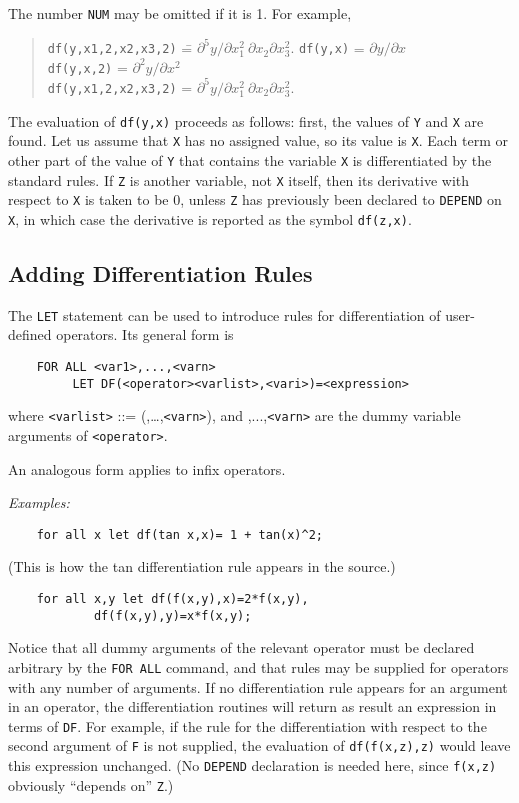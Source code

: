 The number {\tt NUM} may be omitted if it is 1.  For example,
\begin{quote}
\begin{tabbing}
{\tt            df(y,x1,2,x2,x3,2)} \= = $\partial^{5}y/\partial x_{1}^{2} \
 \partial x_{2}\partial x_{3}^{2}.$\kill
{\tt            df(y,x)} \> = $\partial y/\partial x$ \\
{\tt            df(y,x,2)} \> = $\partial^{2}y/\partial x^{2}$ \\
{\tt            df(y,x1,2,x2,x3,2)} \> = $\partial^{5}y/\partial x_{1}^{2} \
 \partial x_{2}\partial x_{3}^{2}.$
\end{tabbing}
\end{quote}
The evaluation of {\tt df(y,x)} proceeds as follows: first, the values of
{\tt Y} and {\tt X} are found.  Let us assume that {\tt X} has no assigned
value, so its value is {\tt X}.  Each term or other part of the value of
{\tt Y} that contains the variable {\tt X} is differentiated by the
standard rules.  If {\tt Z} is another variable, not {\tt X} itself, then
its derivative with respect to {\tt X} is taken to be 0, unless {\tt Z}
has previously been declared to {\tt DEPEND} on {\tt X}, in which
case the derivative is reported as the symbol {\tt df(z,x)}.


\subsection{Adding Differentiation Rules}

The {\tt LET} statement can be used to introduce
rules for differentiation of user-defined operators.  Its general form is
\begin{verbatim}
	FOR ALL <var1>,...,<varn>
	     LET DF(<operator><varlist>,<vari>)=<expression>
\end{verbatim}
where {\tt <varlist>} ::= ({\tt <var1>},\dots,{\tt <varn>}), and
{\tt <var1>},...,{\tt <varn>} are the dummy variable arguments of
{\tt <operator>}.

An analogous form applies to infix operators.

{\it Examples:}
\begin{verbatim}
	for all x let df(tan x,x)= 1 + tan(x)^2;
\end{verbatim}
(This is how the tan differentiation rule appears in the {\REDUCE}
source.)
\begin{verbatim}
	for all x,y let df(f(x,y),x)=2*f(x,y),
			df(f(x,y),y)=x*f(x,y);
\end{verbatim}
Notice that all dummy arguments of the relevant operator must be declared
arbitrary by the {\tt FOR ALL} command, and that rules may be supplied for
operators with any number of arguments.  If no differentiation rule
appears for an argument in an operator, the differentiation routines will
return as result an expression in terms of {\tt DF}\ttindex{DF}.  For
example, if the rule for the differentiation with respect to the second
argument of {\tt F} is not supplied, the evaluation of {\tt df(f(x,z),z)}
would leave this expression unchanged. (No {\tt DEPEND} declaration
is needed here, since {\tt f(x,z)} obviously ``depends on'' {\tt Z}.)


